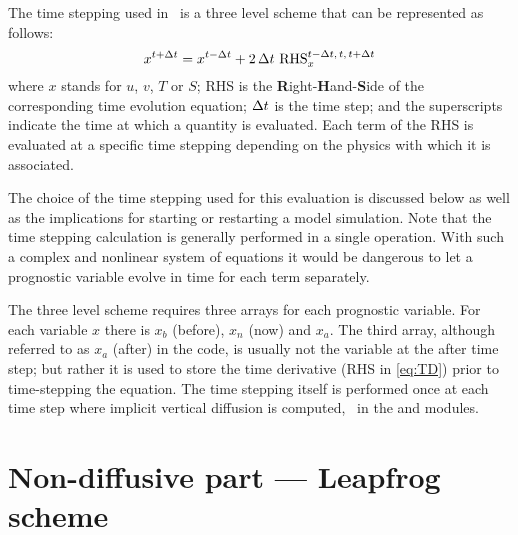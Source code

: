 \documentclass[../main/NEMO_manual]{subfiles}
\begin{document}
The time stepping used in \NEMO\ is a three level scheme that can be represented as follows:
\begin{equation}
  \label{eq:TD}
  x^{t + \Delta t} = x^{t - \Delta t} + 2 \, \Delta t \ \text{RHS}_x^{t - \Delta t, \, t, \, t + \Delta t}
\end{equation}
where $x$ stands for $u$, $v$, $T$ or $S$;
RHS is the \textbf{R}ight-\textbf{H}and-\textbf{S}ide of the corresponding time evolution equation;
$\Delta t$ is the time step;
and the superscripts indicate the time at which a quantity is evaluated.
Each term of the RHS is evaluated at a specific time stepping depending on
the physics with which it is associated.

The choice of the time stepping used for this evaluation is discussed below as well as
the implications for starting or restarting a model simulation.
Note that the time stepping calculation is generally performed in a single operation.
With such a complex and nonlinear system of equations it would be dangerous to
let a prognostic variable evolve in time for each term separately.

The three level scheme requires three arrays for each prognostic variable.
For each variable $x$ there is $x_b$ (before), $x_n$ (now) and $x_a$.
The third array, although referred to as $x_a$ (after) in the code,
is usually not the variable at the after time step;
but rather it is used to store the time derivative (RHS in \autoref{eq:TD})
prior to time-stepping the equation.
The time stepping itself is performed once at each time step where
implicit vertical diffusion is computed,
\ie\ in the  and  modules.

\section{Non-diffusive part --- Leapfrog scheme}
\label{sec:TD_leap_frog}
\end{document}
